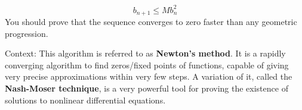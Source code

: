 \documentclass[../psets.tex]{subfiles}
\begin{document}
\begin{enumerate}
\begin{enumerate}
        \begin{equation*}
            b_{n+1} \leq Mb_n^2
        \end{equation*}
        You should prove that the sequence converges to zero faster than any geometric progression.\par
        Context: This algorithm is referred to as \textbf{Newton's method}. It is a rapidly converging algorithm to find zeros/fixed points of functions, capable of giving very precise approximations within very few steps. A variation of it, called the \textbf{Nash-Moser technique}, is a very powerful tool for proving the existence of solutions to nonlinear differential equations.
    \end{enumerate}
\end{enumerate}
\end{document}
